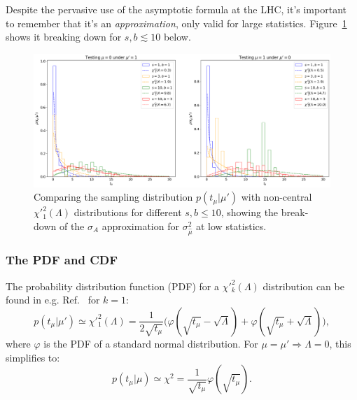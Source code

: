 Despite the pervasive use of the asymptotic formula at the LHC, it's important to remember that it's an \textit{approximation}, only valid for large statistics.
Figure~\ref{fig:03_ptmu_asym3} shows it breaking down for $s, b \lesssim 10$ below.

\begin{figure}[htb]
  \centering
  \includegraphics[width=\textwidth]{figures/03-Stats/06-asymptotic-plr/4.png}
  \caption{Comparing the sampling distribution $p(t_\mu|\mu')$ with non-central $\chi'^2_1(\Lambda)$ distributions for different $s, b \leq 10$, showing the break-down of the $\sigma_A$ approximation for $\sigma^2_{\hat\mu}$ at low statistics.}
  \label{fig:03_ptmu_asym3}
\end{figure}

\subsubsection{The PDF and CDF}

The probability distribution function (PDF) for a $\chi'^2_k(\Lambda)$ distribution can be found in e.g. Ref.~\cite{enwiki:1256854724} for $k=1$:
\begin{equation}
    p(t_\mu|\mu') \simeq \chi'^2_1(\Lambda) = \frac{1}{2\sqrt{t_\mu}}\big(\varphi(\sqrt{t_\mu} - \sqrt\Lambda) + \varphi(\sqrt{t_\mu} + \sqrt\Lambda)\big),
\label{eq:03_ptmu_pdf}
\end{equation}
where $\varphi$ is the PDF of a standard normal distribution.
For $\mu = \mu' \Rightarrow \Lambda = 0$, this simplifies to:
\begin{equation}
    p(t_\mu|\mu) \simeq \chi^2 = \frac{1}{\sqrt{t_\mu}}\varphi(\sqrt{t_\mu}).
\label{eq:03_ptmu_pdf_special}
\end{equation}


